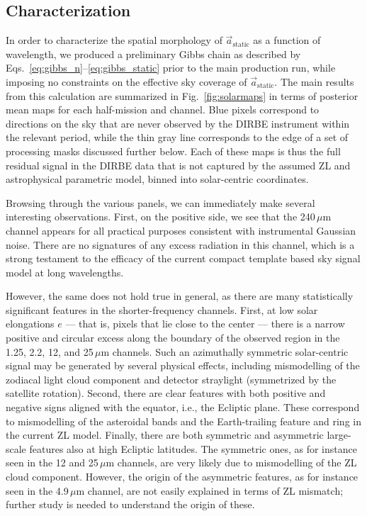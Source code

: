 \documentclass{aa}
\renewcommand{\a}[0]{\vec{a}}
\begin{document}
\subsection{Characterization}

In order to characterize the spatial morphology of
$\a_{\mathrm{static}}$ as a function of wavelength, we produced a
preliminary Gibbs chain as described by
Eqs.~\eqref{eq:gibbs_n}--\eqref{eq:gibbs_static} prior to the main
production run, while imposing no constraints on the effective sky
coverage of $\a_{\mathrm{static}}$. The main results from this
calculation are summarized in Fig.~\ref{fig:solarmaps} in terms of
posterior mean maps for {each half-mission and channel}. Blue pixels correspond to
directions on the sky that are never observed by the DIRBE instrument {within the relevant period},
while the thin gray line corresponds to the edge of a set of
processing masks discussed further below. Each of these maps is thus
the full residual signal in the DIRBE data that is not
captured by the assumed ZL and astrophysical parametric model, binned
into solar-centric coordinates.



Browsing through the various panels, we can immediately make several
interesting observations. First, {on the positive side}, we see
that {the 240$\,\mu$m channel appears} for all practical
purposes consistent with instrumental Gaussian noise. There are no
signatures of any excess radiation in this channel, which is a
strong testament to the efficacy of the {current compact template based
sky signal} model at long wavelengths.

{However, the same does not hold true in general, as there are
  many statistically significant features in the shorter-frequency
  channels. First, at low solar elongations $e$ --- that is, pixels
  that lie close to the center --- there is a narrow positive and
  circular excess along the boundary of the observed region in the
  1.25, 2.2, 12, and 25\,$\mu$m channels. Such an azimuthally symmetric
  solar-centric signal may be generated by several physical effects,
  including mismodelling of the zodiacal light cloud component and
  detector straylight (symmetrized by the satellite rotation). Second,
  there are clear features with both positive and negative signs
  aligned with the equator, i.e., the Ecliptic plane. These correspond to
  mismodelling of the asteroidal bands and the Earth-trailing feature
  and ring in the current ZL model. Finally, there are both symmetric
  and asymmetric large-scale features also at high Ecliptic
  latitudes. The symmetric ones, as for instance seen in the 12 and
  25\,$\mu$m channels, are very likely due to mismodelling of the ZL
  cloud component. However, the origin of the asymmetric features, as for
  instance seen in the 4.9\,$\mu$m channel, are not easily explained
  in terms of ZL mismatch; further study is needed to understand the
  origin of these.
  }
\end{document}
